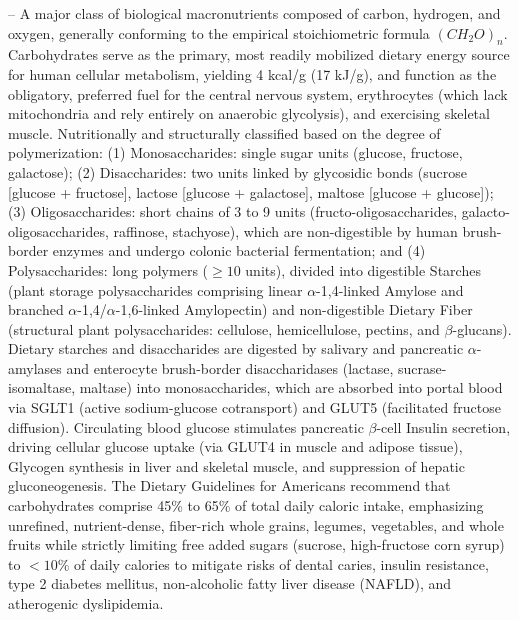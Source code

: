 -- A major class of biological macronutrients composed of carbon, hydrogen, and oxygen, generally conforming to the empirical stoichiometric formula $(CH_2O)_n$. Carbohydrates serve as the primary, most readily mobilized dietary energy source for human cellular metabolism, yielding 4 kcal/g (17 kJ/g), and function as the obligatory, preferred fuel for the central nervous system, erythrocytes (which lack mitochondria and rely entirely on anaerobic glycolysis), and exercising skeletal muscle. Nutritionally and structurally classified based on the degree of polymerization: (1) Monosaccharides: single sugar units (glucose, fructose, galactose); (2) Disaccharides: two units linked by glycosidic bonds (sucrose [glucose + fructose], lactose [glucose + galactose], maltose [glucose + glucose]); (3) Oligosaccharides: short chains of 3 to 9 units (fructo-oligosaccharides, galacto-oligosaccharides, raffinose, stachyose), which are non-digestible by human brush-border enzymes and undergo colonic bacterial fermentation; and (4) Polysaccharides: long polymers ($\ge 10$ units), divided into digestible Starches (plant storage polysaccharides comprising linear $\alpha$-1,4-linked Amylose and branched $\alpha$-1,4/$\alpha$-1,6-linked Amylopectin) and non-digestible Dietary Fiber (structural plant polysaccharides: cellulose, hemicellulose, pectins, and $\beta$-glucans). Dietary starches and disaccharides are digested by salivary and pancreatic $\alpha$-amylases and enterocyte brush-border disaccharidases (lactase, sucrase-isomaltase, maltase) into monosaccharides, which are absorbed into portal blood via SGLT1 (active sodium-glucose cotransport) and GLUT5 (facilitated fructose diffusion). Circulating blood glucose stimulates pancreatic $\beta$-cell Insulin secretion, driving cellular glucose uptake (via GLUT4 in muscle and adipose tissue), Glycogen synthesis in liver and skeletal muscle, and suppression of hepatic gluconeogenesis. The Dietary Guidelines for Americans recommend that carbohydrates comprise 45\% to 65\% of total daily caloric intake, emphasizing unrefined, nutrient-dense, fiber-rich whole grains, legumes, vegetables, and whole fruits while strictly limiting free added sugars (sucrose, high-fructose corn syrup) to $<10\%$ of daily calories to mitigate risks of dental caries, insulin resistance, type 2 diabetes mellitus, non-alcoholic fatty liver disease (NAFLD), and atherogenic dyslipidemia.

